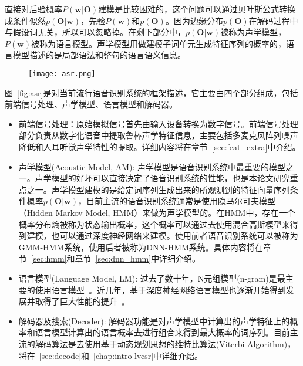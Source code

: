 直接对后验概率$P(\mathbf{w}|\mathbf{O})$建模是比较困难的，这个问题可以通过贝叶斯公式转换成条件似然$p(\mathbf{O}|\mathbf{w})$，先验$P(\mathbf{w})$和$p(\mathbf{O})$。因为边缘分布$p(\mathbf{O})$在解码过程中与假设词无关，所以可以忽略掉。在剩下部分中，$p(\mathbf{O}|\mathbf{w})$被称为声学模型，$P(\mathbf{w})$被称为语言模型。声学模型用做建模子词单元生成特征序列的概率的，语言模型描述的是局部语法和整句的语言语义信息。

\begin{figure}[!htp]
  \centering
    \captionstyle{\centering}
    \texttt{[image: asr.png]}
\end{figure}

图~\ref{fig:asr}是对当前流行语音识别系统的框架描述，它主要由四个部分组成，包括前端信号处理、声学模型、语言模型和解码器。
\begin{itemize}
    \item 前端信号处理：原始模拟信号首先由输入设备转换为数字信号。前端信号处理部分负责从数字化语音中提取鲁棒声学特征信息，主要包括多麦克风阵列噪声降低和人耳听觉声学特性的提取。详细内容将在章节~\ref{sec:feat_extra}中介绍。
    \item 声学模型(Acoustic Model, AM): 声学模型是语音识别系统中最重要的模型之一。声学模型的好坏可以直接决定了语音识别系统的性能，也是本论文研究重点之一。声学模型建模的是给定词序列生成出来的所观测到的特征向量序列条件概率$p(\mathbf{O}|\mathbf{w})$，目前主流的语音识别系统通常是使用隐马尔可夫模型（Hidden Markov Model, HMM）来做为声学模型的。在HMM中，存在一个概率分布熵被称为状态输出概率，这个概率可以通过去使用混合高斯模型来得到建模，也可以通过深度神经网络来建模。使用前者语音识别系统可以被称为GMM-HMM系统，使用后者被称为DNN-HMM系统。具体内容将在章节~\ref{sec:hmm}和章节~\ref{sec:dnn_hmm}中详细介绍。
    \item 语言模型(Language Model, LM): 过去了数十年，N元组模型(n-gram)是最主要的使用语言模型~\cite{good1953population,katz1987estimation,brown1992class}。近几年，基于深度神经网络语言模型也逐渐开始得到发展并取得了巨大性能的提升~\cite{mikolov2010recurrent,mikolov2012statistical}。
    \item 解码器及搜索(Decoder): 解码器功能是对声学模型中计算出的声学特征上的概率和语言模型计算出的语言概率去进行组合来得到最大概率的词序列。目前主流的解码算法是去使用基于动态规划思想的维特比算法(Viterbi Algorithm)，将在~\ref{sec:decode}和~\ref{chap:intro-lvcsr}中详细介绍。
\end{itemize}

